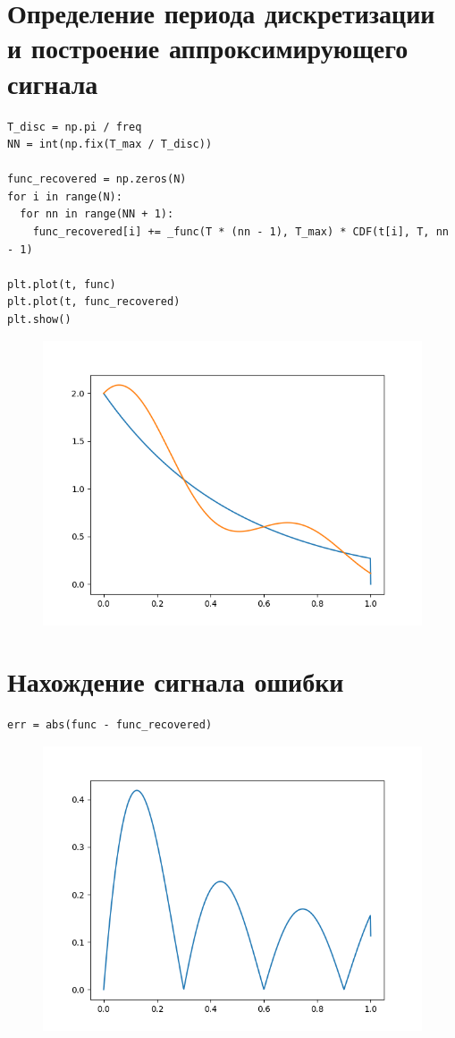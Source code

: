 \documentclass[12pt]{article}
\begin{document}
\section{ Определение периода дискретизации и построение аппроксимирующего сигнала}



\begin{lstlisting}
T_disc = np.pi / freq
NN = int(np.fix(T_max / T_disc))

func_recovered = np.zeros(N)
for i in range(N):
  for nn in range(NN + 1):
    func_recovered[i] += _func(T * (nn - 1), T_max) * CDF(t[i], T, nn - 1)

plt.plot(t, func)
plt.plot(t, func_recovered)
plt.show()
\end{lstlisting}

\begin{figure}[htp]
\centering
\includegraphics[scale=1.00]{compare.png}
\caption{}
\label{}
\end{figure}

\section{ Нахождение сигнала ошибки}

\begin{lstlisting}
err = abs(func - func_recovered)
\end{lstlisting}


\begin{figure}[htp]
\centering
\includegraphics[scale=1.00]{error.png}
\caption{}
\label{}
\end{figure}
\end{document}
